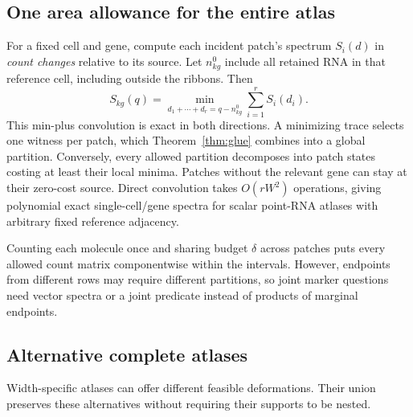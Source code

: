 \documentclass[10pt,letterpaper]{article}
\begin{document}
\subsection{One area allowance for the entire atlas}
For a fixed cell and gene, compute each incident patch's spectrum $S_i(d)$ in \emph{count changes} relative to its source. Let $n^0_{kg}$ include all retained RNA in that reference cell, including outside the ribbons. Then
\begin{equation}
S_{kg}(q)=\min_{d_1+\cdots+d_r=q-n^0_{kg}}\sum_{i=1}^r S_i(d_i).\label{eq:convolution}
\end{equation}
This min-plus convolution is exact in both directions. A minimizing trace selects one witness per patch, which Theorem~\ref{thm:glue} combines into a global partition. Conversely, every allowed partition decomposes into patch states costing at least their local minima. Patches without the relevant gene can stay at their zero-cost source. Direct convolution takes $O(rW^2)$ operations, giving polynomial exact single-cell/gene spectra for scalar point-RNA atlases with arbitrary fixed reference adjacency.

Counting each molecule once and sharing budget $\delta$ across patches puts every allowed count matrix componentwise within the intervals. However, endpoints from different rows may require different partitions, so joint marker questions need vector spectra or a joint predicate instead of products of marginal endpoints.

\subsection{Alternative complete atlases}
Width-specific atlases can offer different feasible deformations. Their union preserves these alternatives without requiring their supports to be nested.
\end{document}

